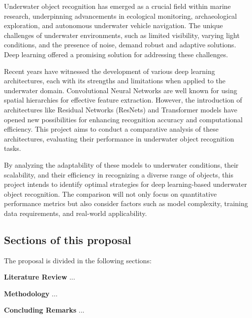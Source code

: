 Underwater object recognition has emerged as a crucial field within marine
research, underpinning advancements in ecological monitoring, archaeological
exploration, and autonomous underwater vehicle navigation.
The unique challenges of underwater environments, such as limited visibility,
varying light conditions, and the presence of noise, demand robust and adaptive
solutions.
Deep learning offered a promising solution for addressing these challenges.

Recent years have witnessed the development of various deep learning
architectures, each with its strengths and limitations when applied to the
underwater domain.
Convolutional Neural Networks are well known for
using spatial hierarchies for effective feature extraction.
However, the introduction of architectures like Residual Networks (ResNets)
and Transformer models have opened new possibilities for enhancing recognition
accuracy and computational efficiency.
This project aims to conduct a comparative analysis of these architectures,
evaluating their performance in underwater object recognition tasks.

By analyzing the adaptability of these models to underwater conditions,
their scalability, and their efficiency in recognizing a diverse range of
objects, this project intends to identify optimal strategies
for deep learning-based underwater object recognition.
The comparison will not only focus on quantitative performance metrics but also
consider factors such as model complexity,
training data requirements, and real-world applicability.

\vspace{10pt}

\subsection{Sections of this proposal}

The proposal is divided in the following sections:

\begin{APAitemize}
    \item \textbf{Literature Review} ...
    \item \textbf{Methodology} ... 
    \item \textbf{Concluding Remarks} ...
\end{APAitemize}